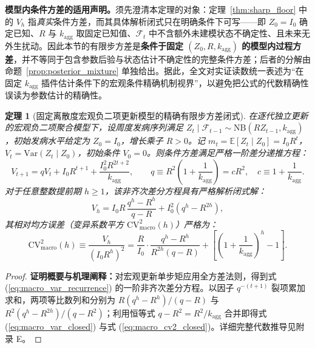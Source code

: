 \documentclass[11pt,a4paper]{article}
\theoremstyle{plain}
\newtheorem{theorem}{定理}
\theoremstyle{definition}
\begin{document}
\label{sec:macro_model}

\noindent\textbf{模型内条件方差的适用声明。}须先澄清本定理的对象：定理~\ref{thm:sharp_floor} 中的 $V_h$ 指\emph{真实}条件方差，而其具体解析闭式只在明确条件下可写——即 $Z_0=I_0$ 确定已知、$R$ 与 $k_{\text{agg}}$ 取固定已知值、$\mathcal{F}_t$ 中不含额外未建模状态不确定性、且未来无外生扰动。因此本节的有限步方差是\textbf{条件于固定 $(Z_0,R,k_{\text{agg}})$ 的模型内过程方差}，并不等同于包含参数后验与状态估计不确定性的完整条件方差；后者的分解由命题~\ref{prop:posterior_mixture} 单独给出。据此，全文对实证读数统一表述为“在固定 $k_{\text{agg}}$ 插件估计条件下的宏观条件精确机制视界”，以避免把公式的代数精确性误读为参数估计的精确性。

\begin{theorem}[固定离散度宏观负二项更新模型的精确有限步方差闭式]\label{thm:macro_exact}
在逐代独立更新的宏观负二项聚合模型下，设周度发病序列满足 $Z_t \mid \mathcal{F}_{t-1} \sim \text{NB}(R Z_{t-1}, k_{\text{agg}})$，初始发病水平给定为 $Z_0 = I_0$，增长乘子 $R > 0$。记 $m_t = \mathbb{E}[Z_t \mid Z_0] = I_0 R^t$，$V_t = \text{Var}(Z_t \mid Z_0)$，初始条件 $V_0 = 0$。则条件方差满足严格一阶差分递推方程：
\begin{equation}
V_{t+1} = q V_t + I_0 R^{t+1} + \frac{I_0^2 R^{2t+2}}{k_{\text{agg}}}, \qquad q \equiv R^2 \left(1 + \frac{1}{k_{\text{agg}}}\right) = c R^2, \quad c \equiv 1 + \frac{1}{k_{\text{agg}}}. \label{eq:macro_var_recurrence}
\end{equation}
对于任意整数提前期 $h \ge 1$，该非齐次差分方程具有严格解析闭式解：
\begin{equation}
V_h = I_0 R\, \frac{q^h - R^h}{q - R} + I_0^2 \left(q^h - R^{2h}\right), \label{eq:macro_var_closed}
\end{equation}
其相对均方误差（变异系数平方 $\text{CV}^2_{\text{macro}}(h)$）严格为：
\begin{equation}
\text{CV}^2_{\text{macro}}(h) \equiv \frac{V_h}{(I_0 R^h)^2} = \frac{R}{I_0}\cdot\frac{q^h - R^h}{R^{2h}(q - R)} + \left[\left(1 + \frac{1}{k_{\text{agg}}}\right)^{\!h} - 1\right]. \label{eq:macro_cv2_closed}
\end{equation}
\end{theorem}

\begin{proof}
\textbf{证明概要与机理阐释：}对宏观更新单步矩应用全方差法则，得到式 (\ref{eq:macro_var_recurrence}) 的一阶非齐次差分方程。以因子 $q^{-(t+1)}$ 裂项累加求和，两项等比数列和分别为 $R(q^h-R^h)/(q-R)$ 与 $R^2(q^h-R^{2h})/(q-R^2)$；利用恒等式 $q - R^2 = R^2/k_{\text{agg}}$ 合并即得式 (\ref{eq:macro_var_closed}) 与式 (\ref{eq:macro_cv2_closed})。详细完整代数推导见附录 E。
\end{proof}
\end{document}
